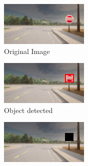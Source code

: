 \begin{figure}[htbp]
\centering
\begin{subfigure}[b]{0.24\textwidth}
    \includegraphics[width=\textwidth]{img/masking/object_detection/original.png}
    \caption{Original Image}
    \label{fig:orig}
\end{subfigure}
\hfill
\begin{subfigure}[b]{0.24\textwidth}
    \includegraphics[width=\textwidth]{img/masking/object_detection/with_bbox.png}
    \caption{Object detected}
    \label{fig:orig_bbox}
\end{subfigure}
\hfill
\begin{subfigure}[b]{0.24\textwidth}
    \includegraphics[width=\textwidth]{img/masking/object_detection/masked.png}

\end{subfigure}
\end{figure}
